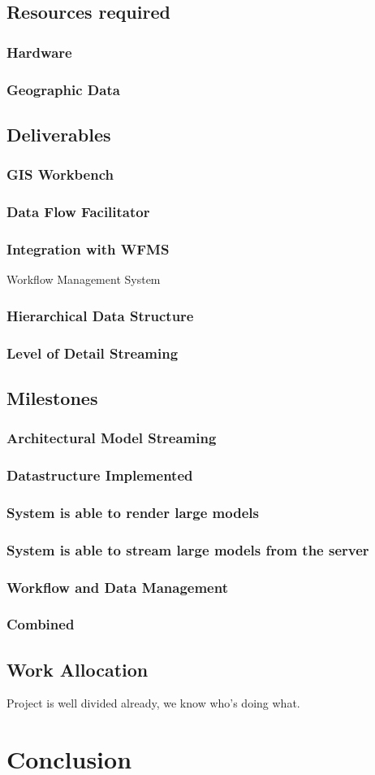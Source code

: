 \documentclass[12pt,a4paper]{article}
\begin{document}
\subsection{Resources required}
\subsubsection*{Hardware}
\subsubsection*{Geographic Data}
\subsection{Deliverables}
\subsubsection{GIS Workbench}
\subsubsection{Data Flow Facilitator}
\subsubsection{Integration with WFMS}
Workflow Management System
\subsubsection{Hierarchical Data Structure}
\subsubsection{Level of Detail Streaming}
\subsection{Milestones}
\subsubsection{Architectural Model Streaming}
\subsubsection*{Datastructure Implemented}
\subsubsection*{System is able to render large models}
\subsubsection*{System is able to stream large models from the server}
\subsubsection{Workflow and Data Management}
\subsubsection{Combined}
\subsection{Work Allocation}
Project is well divided already, we know who's doing what.
\section{Conclusion}
\end{document}
